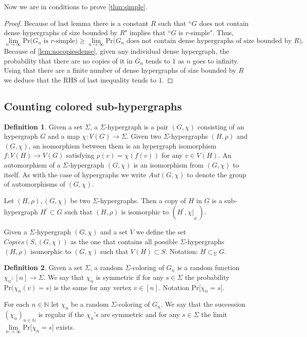 \documentclass[12pt,notitlepage,a4paper]{article}
\theoremstyle{definition}
\newtheorem{definition}{Definition}[section]
\newcommand{\N}{\mathbb{N}}
\newcommand{\Ln}{\lim\limits_{n\to \infty}}
\begin{document}
Now we are in conditions to prove \cref{thm:simple}.

\begin{proof}
	Because of last lemma there is a constant $R$ such that 
	``$G$ does not contain dense hypergraphs of size bounded by $R$" implies
	that ``$G$ is $r$-simple". Thus,
	\[ \Ln \mathrm{Pr}\big( G_n \text{ is } r \text{-simple}  \big)
	\geq \Ln \mathrm{Pr} \big( G_n \text{ does not contain dense 
	hypergraphs of size bounded by } R\big).\] 
	Because of	\cref{lem:nocopiesdense}, given any individual dense hypergraph,
	the probability that there are no copies
	of it in $G_n$ tends to $1$ as $n$ goes to infinity. Using that
	there are a finite number of dense hypergraphs of size bounded by
	$R$ we deduce that the RHS of last inequality tends to $1$. 
\end{proof}

\subsection{Counting colored sub-hypergraphs}


\begin{definition} 
	Given a set $\Sigma$, a $\Sigma$-hypergraph is a pair
	$(G,\chi)$ consisting of an hypergraph $G$ and a map 
	$\chi: V(G) \rightarrow \Sigma$.  
	Given two $\Sigma$-hypergraphs $(H,\rho)$ and $(G,\chi)$,
	an isomorphism between them is an hypergraph isomorphism 
	$f:V(H)\rightarrow V(G)$ satisfying $\rho(v)=\chi(f(v))$
	for any $v\in V(H)$. 
	An automorphism of a $\Sigma$-hypergraph $(G,\chi)$ is an
	isomorphism from $(G,\chi)$ to itself. As with the case of
	hypergraphs we write $Aut(G,\chi)$ to denote the group of 
	automorphisms of $(G,\chi)$.
	\par
	Let $(H,\rho), (G,\chi)$ be two $\Sigma$-hypergraphs. 
	Then a copy of $H$ in $G$ is
	a sub-hypergraph $H^\prime\subset G$ such that 
	$(H,\rho)$ is isomorphic to 
	$(H^\prime,\chi|_{_{H^\prime}})$.\par
	Given a $\Sigma$-hypergraph $(G,\chi)$ and a set $V$ we
	define the set $Copies(S,(G, \chi))$ as the one that contains all 
	possible $\Sigma$-hypergraphs $(H,\rho)$ isomorphic to $(G,\chi)$ 
	such that $V(H)\subset S$.
	Notation: $H\subset_{\Sigma}G$.
	
\end{definition}

\begin{definition}
	Given a set $\Sigma$, a random $\Sigma$-coloring of $G_n$ is 
	a random function $\chi_n: [n]\rightarrow \Sigma$. We say that	
	$\chi_n$ is symmetric if for any $s\in \Sigma$ the probability
	$\mathrm{Pr}\big( \chi_n(v)=s \big)$ is the same for any vertex
	$v\in [n]$. Notation $\mathrm{Pr}\big[\chi_n=s\big]$. \par
	For each $n\in \N$ let $\chi_n$ be a random $\Sigma$-coloring of $G_n$.
	We say that the succession $(\chi_n)_{n\in \N}$ is regular if
	the $\chi_n$'s are symmetric and for any $s\in \Sigma$ the limit
	$\Ln \mathrm{Pr}\big[ \chi_n = s \big]$ exists. 
\end{definition}
\end{document}
